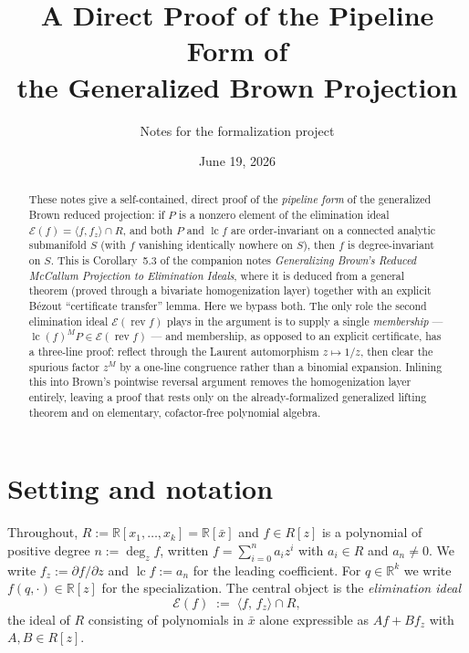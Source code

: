 \documentclass[11pt,a4paper]{article}
\title{A Direct Proof of the Pipeline Form of\\ the Generalized Brown Projection}
\author{Notes for the \code{mccalum} formalization project}
\date{June 19, 2026}
\theoremstyle{definition}
\newcommand{\R}{\mathbb{R}}
\newcommand{\xb}{\bar{x}}
\newcommand{\lc}{\operatorname{lc}}
\newcommand{\rev}{\operatorname{rev}}
\newcommand{\E}{\mathcal{E}}
\newcommand{\ideal}[1]{\langle #1\rangle}
\begin{document}
\maketitle

\begin{abstract}
These notes give a self-contained, direct proof of the \emph{pipeline form} of
the generalized Brown reduced projection: if $P$ is a nonzero element of the
elimination ideal $\E(f) = \ideal{f,f_z}\cap R$, and both $P$ and $\lc f$ are
order-invariant on a connected analytic submanifold $S$ (with $f$ vanishing
identically nowhere on $S$), then $f$ is degree-invariant on $S$. This is
Corollary~5.3 of the companion notes \emph{Generalizing Brown's Reduced
McCallum Projection to Elimination Ideals}, where it is deduced from a general
theorem (proved through a bivariate homogenization layer) together with an
explicit B\'ezout ``certificate transfer'' lemma. Here we bypass both. The only
role the second elimination ideal $\E(\rev f)$ plays in the argument is to
supply a single \emph{membership} --- $\lc(f)^M P \in \E(\rev f)$ --- and
membership, as opposed to an explicit certificate, has a three-line proof:
reflect through the Laurent automorphism $z \mapsto 1/z$, then clear the
spurious factor $z^M$ by a one-line congruence rather than a binomial
expansion. Inlining this into Brown's pointwise reversal argument removes the
homogenization layer entirely, leaving a proof that rests only on the
already-formalized generalized lifting theorem and on elementary, cofactor-free
polynomial algebra.
\end{abstract}

\section{Setting and notation}\label{sec:setting}

Throughout, $R := \R[x_1,\dots,x_k] = \R[\xb]$ and $f \in R[z]$ is a polynomial
of positive degree $n := \deg_z f$, written $f = \sum_{i=0}^{n} a_i z^i$ with
$a_i \in R$ and $a_n \neq 0$. We write $f_z := \partial f/\partial z$ and
$\lc f := a_n$ for the leading coefficient. For $q \in \R^k$ we write
$f(q,\cdot) \in \R[z]$ for the specialization. The central object is the
\emph{elimination ideal}
\[
  \E(f) \;:=\; \ideal{f,\, f_z} \cap R ,
\]
the ideal of $R$ consisting of polynomials in $\xb$ alone expressible as
$A f + B f_z$ with $A, B \in R[z]$.
\end{document}
